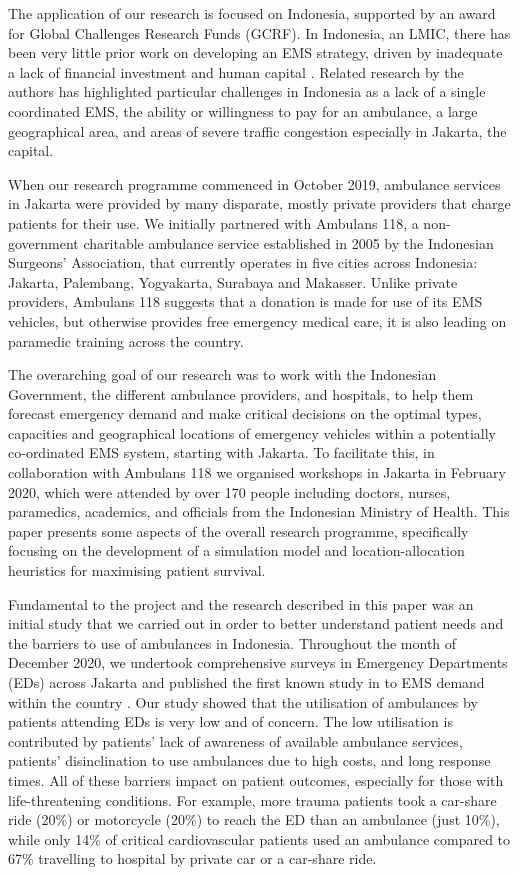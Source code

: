 \documentclass[preprint,12pt]{elsarticle}
\begin{document}
The application of our research is focused on Indonesia, supported by an
award for Global Challenges Research Funds (GCRF). In Indonesia, an LMIC,
there has been very little prior work on developing an EMS strategy, driven
by inadequate a lack of financial investment and
human capital \cite{plummer2017ems,pusponegoro2003terrorism,yusvirazi2018state}.
Related research by the authors \cite{BriceSyaribahNoor2022Esui} has
highlighted particular challenges in Indonesia as a lack of a single
coordinated EMS, the ability or willingness to pay for an ambulance, a large
geographical area, and areas of severe traffic congestion especially in
Jakarta, the capital.  

When our research programme commenced in October 2019, ambulance services in
Jakarta were provided by many disparate, mostly private providers that charge
patients for their use. We initially partnered with
Ambulans 118, a non-government charitable ambulance service established in
2005 by the Indonesian Surgeons’ Association, that  currently operates in five
cities across Indonesia: Jakarta, Palembang, Yogyakarta, Surabaya and Makasser.
Unlike private providers, Ambulans 118 suggests that a donation is made for
use of its EMS vehicles, but otherwise provides free emergency medical care,
it is also leading on paramedic training across the country. 

The overarching goal of our research was to work with the Indonesian
Government, the different ambulance providers, and hospitals, to help them
forecast emergency demand and make critical decisions on the optimal types,
capacities and geographical locations of emergency vehicles within a
potentially co-ordinated EMS system, starting with Jakarta. To facilitate
this, in collaboration with Ambulans 118 we organised workshops in Jakarta in
February 2020,
which were attended by over 170 people including doctors, nurses, paramedics,
academics, and officials from the Indonesian Ministry of Health. This paper
presents some aspects of the overall research programme, specifically focusing
on the development of a simulation model and location-allocation heuristics
for maximising patient survival.  

Fundamental to the project and the research described in this paper was an
initial study that we carried out in order to better understand patient needs
and the barriers to use of ambulances in Indonesia. Throughout the month of
December 2020, we undertook comprehensive surveys in Emergency Departments
(EDs) across Jakarta and published the first known study in to EMS demand
within the country \cite{BriceSyaribahNoor2022Esui}. Our study showed that the
utilisation of ambulances by patients attending EDs is very low and of
concern. The low utilisation is contributed by patients' lack of awareness of
available ambulance services, patients'
disinclination to use ambulances due to high costs, and long response times.
All of these barriers impact on patient outcomes, especially for those with
life-threatening conditions. For example, more trauma patients took
a car-share ride (20\%) or motorcycle (20\%) to reach the ED than an ambulance
(just 10\%), while only 14\% of critical cardiovascular patients used an
ambulance compared to 67\% travelling to hospital by private car or a
car-share ride.
\end{document}
